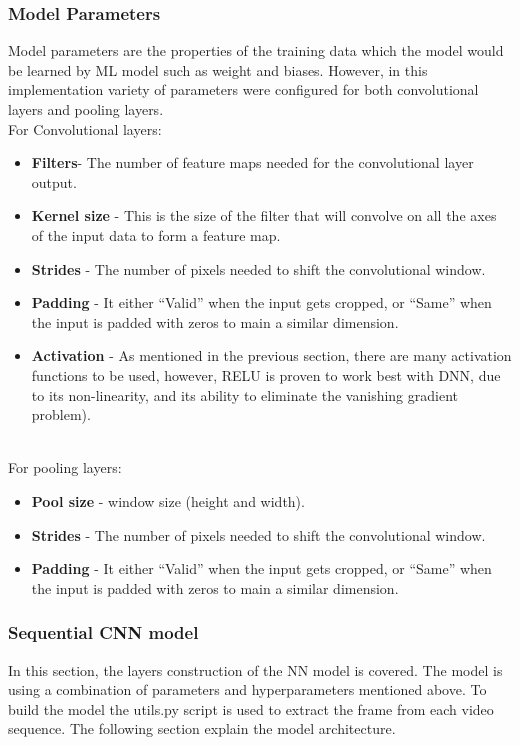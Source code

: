 \subsubsection{Model Parameters}
\hspace{5mm} Model parameters are the properties of the training data which the model would be learned by ML model such as weight and biases. However, in this implementation variety of parameters were configured for both convolutional layers and pooling layers.\\

For Convolutional layers:
\begin{itemize}
\item \textbf{Filters}- The number of feature maps needed for the convolutional layer output.
\item \textbf{Kernel size} - This is the size of the filter that will convolve on all the axes of the input data to form a feature map.
\item \textbf{Strides} - The number of pixels needed to shift the convolutional window.
\item \textbf{Padding} - It either “Valid” when the input gets cropped, or “Same” when the input is padded with zeros to main a similar dimension.
\item \textbf{Activation }- As mentioned in the previous section, there are many activation functions to be used, however, RELU is proven to work best with DNN, due to its non-linearity, and its ability to eliminate the vanishing gradient problem).
\end{itemize}\\

For pooling layers:
\begin{itemize}
\item \textbf{Pool size} - window size (height and width).
\item \textbf{Strides} - The number of pixels needed to shift the convolutional window.
\item \textbf{Padding} - It either “Valid” when the input gets cropped, or “Same” when the input is padded with zeros to main a similar dimension.
\end{itemize}

\subsubsection{Sequential CNN model}
\hspace{5mm} In this section, the layers construction of the NN model is covered. The model is using a combination of parameters and hyperparameters mentioned above. To build the model the utils.py script is used to extract the frame from each video sequence. The following section explain the model architecture.\\

